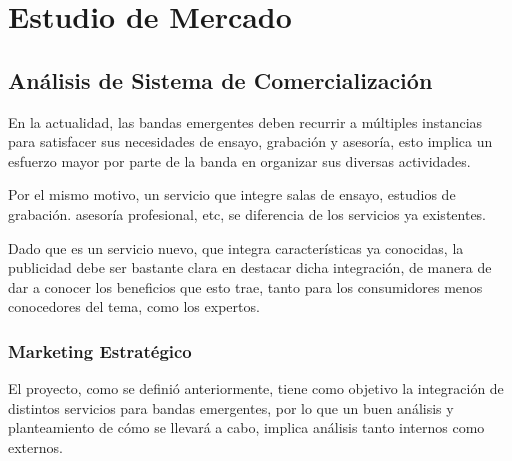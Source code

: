 \section{Estudio de Mercado}

\subsection{Análisis de Sistema de Comercialización}

En la actualidad, las bandas emergentes deben recurrir a múltiples
instancias para satisfacer sus necesidades de ensayo, grabación y asesoría,
esto implica un esfuerzo mayor por parte de la banda en organizar sus diversas actividades.

Por el mismo motivo, un servicio que integre salas de ensayo, estudios
 de grabación. asesoría profesional, etc, se diferencia de los servicios ya existentes.

Dado que es un servicio nuevo, que integra características ya conocidas, 
la publicidad debe ser bastante clara en destacar dicha integración, de 
manera de dar a conocer los beneficios que esto trae, tanto para los 
consumidores menos conocedores del tema, como los expertos.
	
\subsubsection{Marketing Estratégico}

El proyecto, como se definió anteriormente, tiene como objetivo la 
integración de distintos servicios para bandas emergentes, por lo que 
un buen análisis y planteamiento de cómo se llevará a cabo, implica 
análisis tanto internos como externos.

